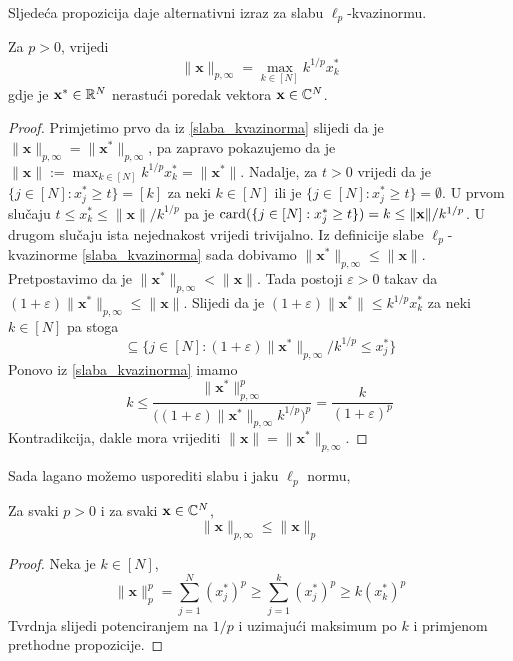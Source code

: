 \documentclass[a4paper,twoside,12pt]{memoir} %
\newcommand{\vect}[1]{\mathbf{#1}}
\renewcommand{\vec}{\vect}
\newcommand{\card}{\text{\normalfont{card}}}
\begin{document}
\noindent Sljede\'ca propozicija daje alternativni izraz za slabu $\ell_p$-kvazinormu.
\begin{prop}\label{slaba_kvazinorma_2}
    Za $p>0$, vrijedi
    \begin{equation*}
        \|\vec{x}\|_{p, \infty} = \max \limits_{k \in [N]}k^{1/p}x_k^{*}
    \end{equation*}
    gdje je $\vec{x}^* \in \R^N$ nerastu\'ci poredak vektora $\vec{x}\in \C^N$.
\end{prop}
\begin{proof}
    Primjetimo prvo da iz \eqref{slaba_kvazinorma} slijedi da je $\|\vec{x}\|_{p, \infty}=\|\vec{x}^*\|_{p, \infty}$, pa zapravo pokazujemo da je $\|\vec{x}\|:= \max_{k \in [N]}k^{1/p}x_k^* = \|\vec{x}^*\|$. Nadalje, za $t>0$ vrijedi da je $\{j \in [N]: x^*_j \geq t\}=[k]$ za neki $k \in [N]$ ili je $\{j \in [N]: x^*_j \geq t\}=\emptyset$. U prvom slu\v{c}aju $t \leq x^*_k \leq \|\vec{x}\|/k^{1/p}$ pa je $\card(\{j \in [N]:x_j^* \geq t \}) = k \leq \|\vec{x}\|/k^{1/p}$. U drugom slu\v{c}aju ista nejednakost vrijedi trivijalno. Iz definicije slabe $\ell_p$-kvazinorme \eqref{slaba_kvazinorma} sada dobivamo $\|\vec{x}^*\|_{p, \infty} \leq \|\vec{x}\|$. Pretpostavimo da je $\|\vec{x}^*\|_{p, \infty} < \|\vec{x}\|$. Tada postoji $\varepsilon > 0$ takav da $(1+ \varepsilon)\|\vec{x}^*\|_{p, \infty} \leq \|\vec{x}\|$. Slijedi da je $(1 + \varepsilon)\|\vec{x}^*\| \leq  k^{1/p}x^*_k$ za neki $k \in [N]$ pa stoga
    \begin{equation*}
        [k] \subseteq \big\{ j \in [N] : (1 + \varepsilon)\|\vec{x}^*\|_{p, \infty}/k^{1/p} \leq x_j^* \big\}
    \end{equation*}
    Ponovo iz \eqref{slaba_kvazinorma} imamo
    \begin{equation*}
        k \leq \frac{\|\vec{x}^*\|^p_{p, \infty}}{\big( (1 + \varepsilon)\|\vec{x}^*\|_{p, \infty}k^{1/p}\big)^p}=\frac{k}{(1 + \varepsilon)^p}
    \end{equation*}
    Kontradikcija, dakle mora vrijediti $\|\vec{x}\| = \|\vec{x}^*\|_{p, \infty}$.
\end{proof}
\noindent Sada lagano mo\v{z}emo usporediti slabu i jaku $\ell_p$ normu,
\begin{prop}
    Za svaki $p > 0$ i za svaki $\vec{x} \in \C^N$,
    \begin{equation*}
        \|\vec{x}\|_{p, \infty} \leq \|\vec{x}\|_p
    \end{equation*}
\end{prop}
\begin{proof}
    Neka je $k \in [N]$,
    \begin{equation*}
        \|\vec{x}\|_p^p = \sum_{j=1}^{N}(x_j^*)^p \geq \sum_{j=1}^{k}(x_j^*)^p \geq k(x_k^*)^p
    \end{equation*}
    Tvrdnja slijedi potenciranjem na $1/p$ i uzimaju\'ci maksimum po $k$ i primjenom prethodne propozicije.
\end{proof}
\end{document}
